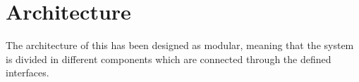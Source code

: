 \section{Architecture}
The architecture of this \epns has been designed as modular, meaning that the system is divided in different components which are connected through the defined interfaces.








